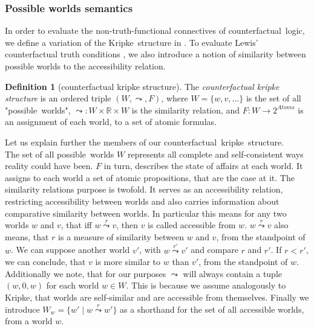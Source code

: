 \documentclass[a4paper,american]{paper}
\theoremstyle{definition}\newtheorem{definition}{Definition}
\begin{document}
\subsubsection{Possible worlds semantics}
In order to evaluate the non-truth-functional connectives of counterfactual~logic, we define a variation of the Kripke~structure in \cite{kripke_modal_logic_1963}. To evaluate Lewis' counterfactual truth conditions \cite{lewis_counterfactuals_1973}, we also introduce a notion of similarity between possible worlds to the accessibility relation.
\begin{definition}[counterfactual kripke structure]
The {\it counterfactual kripke structure} is an ordered triple $(W, \leadsto ,F)$, where $W=\{w,v,...\}$ is the set of all "possible~worlds", $\leadsto \colon W\times \mathbb{R} \times W$ is the similarity relation, and $F \colon W \rightarrow 2^{Atoms}$ is an assignment of each world, to a set of atomic formulas.
\end{definition}
\noindent Let us explain further the members of our counterfactual~kripke~structure.\\
The set of all possible~worlds $W$ represents all complete and self-consistent ways reality could have been. $F$ in turn, describes the state of affairs at each world. It assigns to each world a set of atomic propositions, that are the case at it. The similarity relations purpose is twofold. It serves as an accessibility relation, restricting accessibility between worlds and also carries information about comparative similarity between worlds. In particular this means for any two worlds $w$ and $v$, that iff $w\overset{r}{\leadsto} v$, then $v$ is called accessible from $w$. $w\overset{r}{\leadsto} v$ also means, that $r$ is a measure of similarity between $w$ and $v$, from the standpoint of $w$. We can suppose another world $v'$, with $w\overset{r'}{\leadsto} v'$ and compare $r$ and $r'$. If $r < r'$, we can conclude, that $v$ is more similar to $w$ than $v'$, from the standpoint of $w$. Additionally we note, that for our purposes $\leadsto$ will always contain a tuple $(w, 0, w)$ for each world $w\in W$. This is because we assume analogously to Kripke, that worlds are self-similar and are accessible from themselves. Finally we introduce $W_w = \{w'\mid w \overset{r}{\leadsto} w'\}$ as a shorthand for the set of all accessible worlds, from a world $w$.
\end{document}
